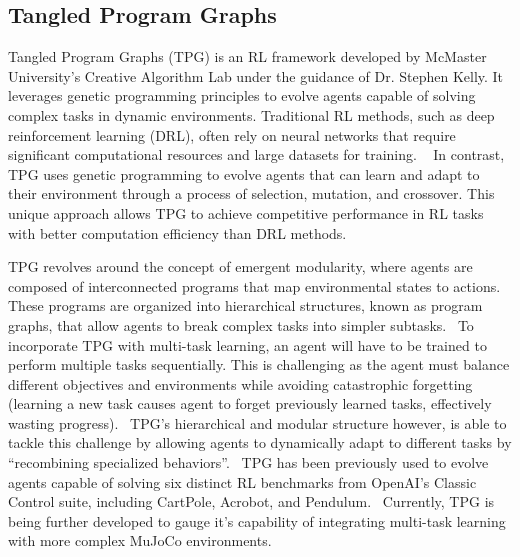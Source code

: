 \documentclass[sigconf]{acmart}
\begin{document}
\subsection{Tangled Program Graphs}
Tangled Program Graphs (TPG) is an RL framework developed by McMaster University’s Creative Algorithm Lab under the guidance of Dr. Stephen Kelly.
It leverages genetic programming principles to evolve agents capable of solving complex tasks in dynamic environments. Traditional RL methods,
such as deep reinforcement learning (DRL), often rely on neural networks that require significant computational resources and large datasets for training.
~\cite{Winkler2025}  In contrast, TPG uses genetic programming to evolve agents that can learn and adapt to their environment through a process of 
selection, mutation, and crossover. This unique approach allows TPG to achieve competitive performance in RL tasks with better computation
efficiency than DRL methods.~\cite{Winkler2025}

TPG revolves around the concept of emergent modularity, where agents are composed of interconnected programs that map environmental states to actions.
These programs are organized into hierarchical structures, known as program graphs, that allow agents to break complex tasks into simpler subtasks.~\cite{Kelly21} To incorporate TPG with multi-task learning, an agent will have to be trained to perform multiple tasks sequentially.
This is challenging as the agent must balance different objectives and environments while  avoiding catastrophic forgetting
(learning a new task causes agent to forget previously learned tasks, effectively wasting progress).~\cite{Kelly21} TPG’s
hierarchical and modular structure however, is able to tackle this challenge by allowing agents to dynamically adapt to different tasks by 
“recombining specialized behaviors”.~\cite{Kelly21} TPG has been previously used to evolve agents capable of solving six distinct RL benchmarks from OpenAI’s
Classic Control suite, including CartPole, Acrobot, and Pendulum.~\cite{Kelly21} Currently, TPG is being further developed to gauge it’s
capability of integrating multi-task learning with more complex MuJoCo environments.
\end{document}
